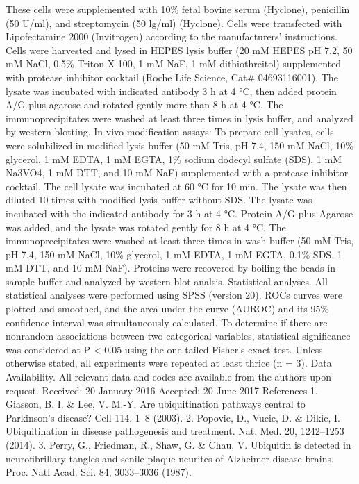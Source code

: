 These cells were supplemented with 10\% fetal bovine serum (Hyclone), penicillin
(50 U/ml), and streptomycin (50 lg/ml) (Hyclone). Cells were transfected with
Lipofectamine 2000 (Invitrogen) according to the manufacturers’ instructions.
Cells were harvested and lysed in HEPES lysis buffer (20 mM HEPES pH 7.2, 50
mM NaCl, 0.5\% Triton X-100, 1 mM NaF, 1 mM dithiothreitol) supplemented
with protease inhibitor cocktail (Roche Life Science, Cat\# 04693116001). The lysate
was incubated with indicated antibody 3 h at 4 °C, then added protein A/G-plus
agarose and rotated gently more than 8 h at 4 °C. The immunoprecipitates were
washed at least three times in lysis buffer, and analyzed by western blotting.
In vivo modiﬁcation assays: To prepare cell lysates, cells were solubilized in
modiﬁed lysis buffer (50 mM Tris, pH 7.4, 150 mM NaCl, 10\% glycerol, 1 mM
EDTA, 1 mM EGTA, 1\% sodium dodecyl sulfate (SDS), 1 mM Na3VO4, 1 mM
DTT, and 10 mM NaF) supplemented with a protease inhibitor cocktail. The cell
lysate was incubated at 60 °C for 10 min. The lysate was then diluted 10 times with
modiﬁed lysis buffer without SDS. The lysate was incubated with the indicated
antibody for 3 h at 4 °C. Protein A/G-plus Agarose was added, and the lysate was
rotated gently for 8 h at 4 °C. The immunoprecipitates were washed at least three
times in wash buffer (50 mM Tris, pH 7.4, 150 mM NaCl, 10\% glycerol, 1 mM
EDTA, 1 mM EGTA, 0.1\% SDS, 1 mM DTT, and 10 mM NaF). Proteins were
recovered by boiling the beads in sample buffer and analyzed by western blot
analsis.
Statistical analyses. All statistical analyses were performed using SPSS (version
20). ROCs curves were plotted and smoothed, and the area under the curve
(AUROC) and its 95\% conﬁdence interval was simultaneously calculated.
To determine if there are nonrandom associations between two categorical
variables, statistical signiﬁcance was considered at P < 0.05 using the one-tailed
Fisher’s exact test. Unless otherwise stated, all experiments were repeated at least
thrice (n = 3).
Data Availability. All relevant data and codes are available from the authors upon
request.
Received: 20 January 2016 Accepted: 20 June 2017
References
1. Giasson, B. I. \& Lee, V. M.-Y. Are ubiquitination pathways central to
Parkinson’s disease? Cell 114, 1–8 (2003).
2. Popovic, D., Vucic, D. \& Dikic, I. Ubiquitination in disease pathogenesis and
treatment. Nat. Med. 20, 1242–1253 (2014).
3. Perry, G., Friedman, R., Shaw, G. \& Chau, V. Ubiquitin is detected in
neuroﬁbrillary tangles and senile plaque neurites of Alzheimer disease brains.
Proc. Natl Acad. Sci. 84, 3033–3036 (1987).
